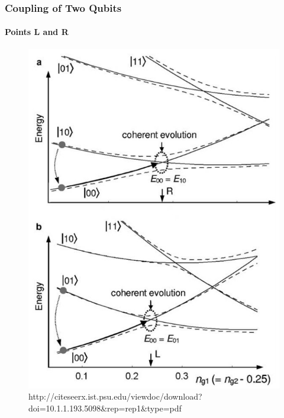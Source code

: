 \documentclass{beamer}
\begin{document}
\begin{frame}
    \frametitle{Coupling of Two Qubits}
    \framesubtitle{Points L and R}
    \begin{figure}[ht!]
        \centering
        \includegraphics[height=0.6\textheight]{img/points-l-and-r.jpg}
        \caption{http://citeseerx.ist.psu.edu/viewdoc/download?doi=10.1.1.193.5098\&rep=rep1\&type=pdf}
    \end{figure}
\end{frame}

\end{document}
